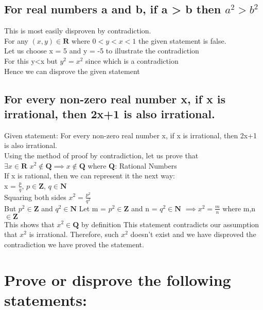 \documentclass{article}
\begin{document}
\subsection{For real numbers a and b, if a > b then $a^2 > b^2$}
\Large This is most easily disproven by contradiction.
\\
\Large For any $(x,y) \in \mathbf{R}$ where $0<y<x<1$ the given statement is false.\\
\Large Let us choose x = 5 and y = -5 to illustrate the contradiction\\
\Large For this y<x but $y^2=x^2$ since  which is a contradiction\\
\Large Hence we can disprove the given statement
\\
\subsection{For every non-zero real number x, if x is irrational, then 2x+1 is also irrational.}
\Large Given statement: For every non-zero real number x, if x is irrational, then 2x+1 is also irrational.\\
\Large Using the method of proof by contradiction, let us prove that\\
$\exists x \in \mathbf{R}$ $ x^2 \notin \mathbf{Q} \implies x \notin \mathbf{Q}$ where $\mathbf{Q}$: Rational Numbers\\
\Large If x is rational, then we can represent it the next way:
\\
x = \(\frac{p}{q}\), $p\in \mathbf{Z}$, $q \in \mathbf{N}$
\\Squaring both sides
\Large $x^2 = \frac{p^2}{q^2}$
\\
But $p^2\in \mathbf{Z}$ and $q^2 \in \mathbf{N}$
Let m = $p^2\in \mathbf{Z}$ and n = $q^2 \in \mathbf{N}$
$\implies x^2 = \frac{m}{n}$ where m,n $\in \mathbf{Z}$
\\ This shows that $x^2 \in \mathbf{Q}$ by definition
This statement contradicts our assumption that  $x^2$ is irrational. Therefore, such  $x^2$ doesn't exist and we have disproved the contradiction we have proved the statement.
\\

\section{Prove or disprove the following statements:}
\end{document}
